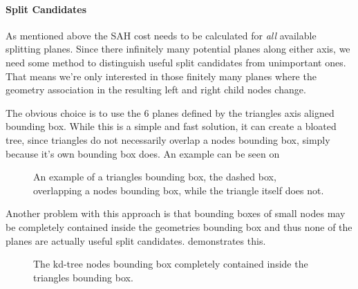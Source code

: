 \paragraph{Split Candidates}


As mentioned above the SAH cost needs to be calculated for
\textit{all} available splitting planes. Since there infinitely many
potential planes along either axis, we need some method to distinguish
useful split candidates from unimportant ones. That means we're only
interested in those finitely many planes where the geometry
association in the resulting left and right child nodes change.


The obvious choice is to use the 6 planes defined by the triangles
axis aligned bounding box. While this is a simple and fast solution,
it can create a bloated tree, since triangles do not necessarily
overlap a nodes bounding box, simply because it's own bounding box
does. An example can be seen on 

\begin{figure}
  \centering
  \caption{An example of a triangles bounding box, the dashed box,
    overlapping a nodes bounding box, while the triangle itself does
    not.}
  \label{fig:aabbSplit}
\end{figure}

Another problem with this approach is that bounding boxes of small
nodes may be completely contained inside the geometries bounding box
and thus none of the planes are actually useful split
candidates.  demonstrates this.

\begin{figure}
  \centering
  \caption{The kd-tree nodes bounding box completely contained inside
    the triangles bounding box.}
  \label{fig:aabbContained}
\end{figure}


